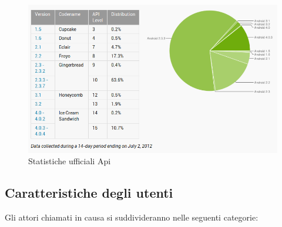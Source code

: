 \begin{figure}[H]
\centering
\caption{Statistiche ufficiali Api}
\includegraphics[scale=0.55]{images/cap1/api} 
\end{figure}

\newpage

\subsection{Caratteristiche degli utenti}
Gli attori chiamati in causa si suddivideranno nelle seguenti categorie:

